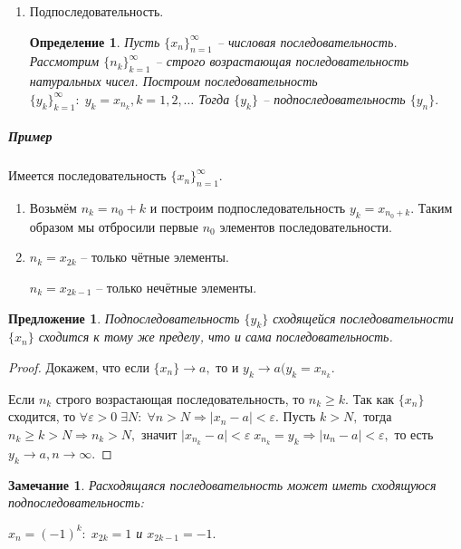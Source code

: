 \documentclass{article}
\newtheorem{Proposition}{Предложение}[section]
\newtheorem{Remark}{Замечание}[section]
\newtheorem{Definition}{Определение}[section]
\begin{document}
\begin{enumerate}
\begin{proof}
если $n>n_0,$ то $\mid x_n\mid<\mid a\mid+1\leq M.$
\end{proof}

Однако может случиться так, что последовательность ограничена и при этом расходится: $x_n=(-1)^{n}.$

\item Подпоследовательность.

\begin{Definition}
Пусть $\{x_n\}_{n=1}^{\infty}$ -- числовая последовательность. Рассмотрим $\{n_k\}_{k=1}^{\infty}$ -- строго возрастающая последовательность натуральных чисел. Построим последовательность $\{y_k\}_{k=1}^{\infty}: \; y_k=x_{n_k}, k=1, 2,\ldots$ Тогда $\{y_k\}$ -- подпоследовательность $\{y_n\}.$
\end{Definition}
\end{enumerate}

\subparagraph{Пример}
Имеется последовательность $\{x_n\}_{n=1}^{\infty}.$
\begin{enumerate}
\item Возьмём $n_k=n_0+k$ и построим подпоследовательность $y_k=x_{n_0+k}.$ Таким образом мы отбросили первые $n_0$ элементов последовательности.
\item $n_k=x_{2k}$ -- только чётные элементы.

$n_k=x_{2k-1}$ -- только нечётные элементы.
\end{enumerate}

\begin{Proposition}
Подпоследовательность $\{y_k\}$ сходящейся последовательности $\{x_n\}$ сходится к тому же пределу, что и сама последовательность.
\end{Proposition}
\begin{proof}
Докажем, что если $\{x_n\}\rightarrow a,$ то и $y_k\rightarrow a (y_k=x_{n_k}.$

Если $n_k$  строго возрастающая последовательность, то $n_k\geq k.$ Так как $\{x_n\}$ сходится, то $\forall\varepsilon>0 \; \exists N: \; \forall n>N \Rightarrow\mid x_n-a\mid<\varepsilon.$ Пусть $k>N,$ тогда $n_k\geq k>N \Rightarrow n_k>N,$ значит $\mid x_{n_k}-a\mid<\varepsilon \; x_{n_k}=y_k \Rightarrow \mid u_n-a\mid<\varepsilon,$ то есть $y_k \rightarrow a, n\rightarrow\infty.$
\end{proof}

\begin{Remark}
Расходящаяся последовательность может иметь сходящуюся подпоследовательность:

$x_n=(-1)^k: \; x_{2k}=1$ и $x_{2k-1}=-1.$
\end{Remark}
\end{document}
